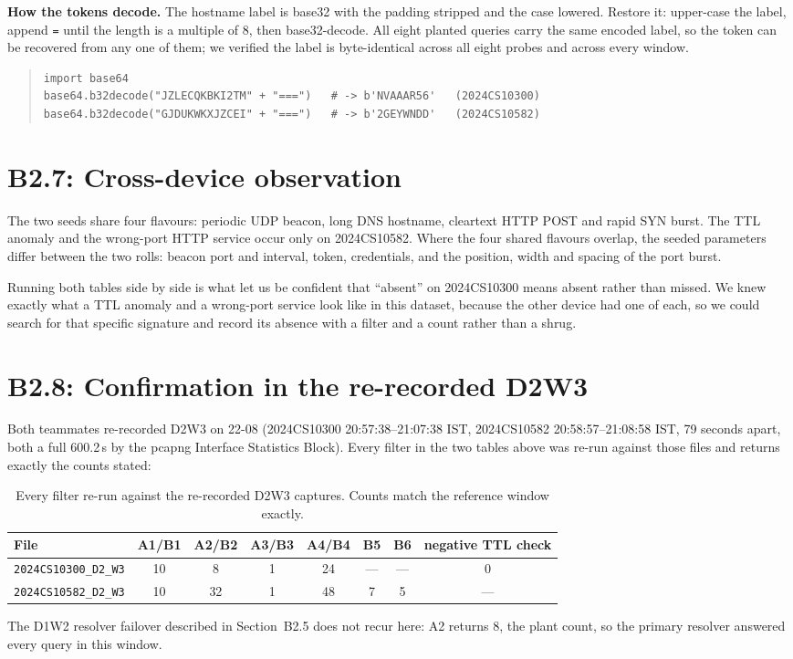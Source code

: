\textbf{How the tokens decode.} The hostname label is base32 with the padding stripped and the
case lowered. Restore it: upper-case the label, append \texttt{=} until the length is a multiple
of 8, then base32-decode. All eight planted queries carry the same encoded label, so the token
can be recovered from any one of them; we verified the label is byte-identical across all eight
probes and across every window.

\begin{quote}\ttfamily\footnotesize
\begin{verbatim}
import base64
base64.b32decode("JZLECQKBKI2TM" + "===")   # -> b'NVAAAR56'   (2024CS10300)
base64.b32decode("GJDUKWKXJZCEI" + "===")   # -> b'2GEYWNDD'   (2024CS10582)
\end{verbatim}
\end{quote}

\section{B2.7: Cross-device observation}

The two seeds share four flavours: periodic UDP beacon, long DNS hostname, cleartext HTTP POST
and rapid SYN burst. The TTL anomaly and the wrong-port HTTP service occur only on
2024CS10582. Where the four shared flavours overlap, the seeded parameters differ between the two
rolls: beacon port and interval, token, credentials, and the position, width and spacing of the
port burst.

Running both tables side by side is what let us be confident that ``absent'' on 2024CS10300 means
absent rather than missed. We knew exactly what a TTL anomaly and a wrong-port service look like
in this dataset, because the other device had one of each, so we could search for that specific
signature and record its absence with a filter and a count rather than a shrug.

\section{B2.8: Confirmation in the re-recorded D2W3}

Both teammates re-recorded D2W3 on 22-08 (2024CS10300 20:57:38--21:07:38 IST, 2024CS10582
20:58:57--21:08:58 IST, 79 seconds apart, both a full 600.2\,s by the pcapng Interface Statistics
Block). Every filter in the two tables above was re-run against those files and returns exactly
the counts stated:

\begin{table}[H]
\centering
\caption{Every filter re-run against the re-recorded D2W3 captures. Counts match the reference
window exactly.}
\label{tab:b2d2w3}
\footnotesize
\begin{tabular}{@{}lccccccc@{}}
\toprule
File & A1/B1 & A2/B2 & A3/B3 & A4/B4 & B5 & B6 & negative TTL check \\
\midrule
\texttt{2024CS10300\_D2\_W3} & 10 & 8 & 1 & 24 & --- & --- & 0 \\
\texttt{2024CS10582\_D2\_W3} & 10 & 32 & 1 & 48 & 7 & 5 & --- \\
\bottomrule
\end{tabular}
\end{table}

The D1W2 resolver failover described in Section~B2.5 does not recur here: A2 returns 8, the plant
count, so the primary resolver answered every query in this window.
